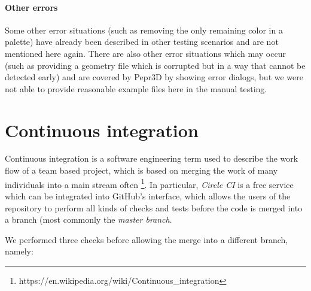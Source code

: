 \paragraph{Other errors}
Some other error situations (such as removing the only remaining color in a palette) have already been described in other testing scenarios and are not mentioned here again.
There are also other error situations which may occur (such as providing a geometry file which is corrupted but in a way that cannot be detected early) and are covered by Pepr3D by showing error dialogs, but we were not able to provide reasonable example files here in the manual testing.

\section{Continuous integration}
\label{sec:ci}

Continuous integration is a software engineering term used to describe the work flow of a team based project, which is based on merging the work of many individuals into a main stream often \footnote{https://en.wikipedia.org/wiki/Continuous\_integration}. In particular, \textit{Circle CI} is a free service which can be integrated into GitHub's interface, which allows the users of the repository to perform all kinds of checks and tests before the code is merged into a branch (most commonly the \textit{master branch}.

We performed three checks before allowing the merge into a different branch, namely:

